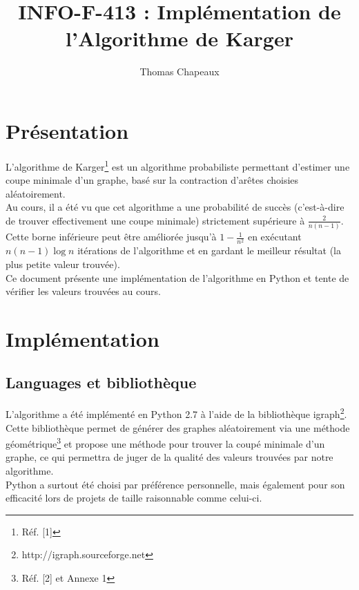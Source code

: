 \documentclass[a4paper,10pt]{article}
\title{INFO-F-413 : Implémentation de l'Algorithme de Karger}
\author{Thomas Chapeaux}
\begin{document}
\sloppy
\maketitle

\section{Présentation}

L'algorithme de 
Karger\footnote{Réf. [1]}
est un algorithme probabiliste permettant d'estimer une coupe minimale d'un graphe,
basé sur la contraction d'arêtes choisies aléatoirement.\\

Au cours, il a été vu que cet algorithme a une probabilité de succès (c'est-à-dire de trouver effectivement une coupe minimale) strictement supérieure à
\begin{math} \frac{2}{n(n-1)} \end{math}.
Cette borne inférieure peut être améliorée jusqu'à
\begin{math} 1- \frac{1}{n^{2}} \end{math} en exécutant
\begin{math} n(n-1)\log{n} \end{math} itérations de l'algorithme et en gardant le meilleur résultat (la plus petite valeur trouvée).\\

Ce document présente une implémentation de l'algorithme en Python et tente de vérifier les valeurs trouvées au cours.\\

\section{Implémentation}

\subsection{Languages et bibliothèque}
L'algorithme a été implémenté en Python 2.7 à l'aide de la bibliothèque
igraph\footnote{http://igraph.sourceforge.net}.
Cette bibliothèque permet de générer des graphes aléatoirement via une méthode
géométrique\footnote{Réf. [2] et Annexe 1}
et propose une méthode pour trouver la coupé minimale d'un graphe, ce qui permettra de juger de la qualité des valeurs trouvées par notre algorithme.\\

Python a surtout été choisi par préférence personnelle, mais également pour son efficacité lors de projets de taille raisonnable comme celui-ci.\\
\end{document}
